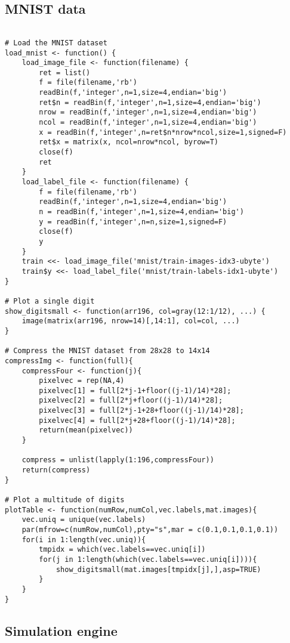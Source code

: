 \subsection{MNIST data}
\label{sec:appendicies:al:simulations:data}
{
\begin{lstlisting}

# Load the MNIST dataset
load_mnist <- function() {
	load_image_file <- function(filename) {
		ret = list()
		f = file(filename,'rb')
		readBin(f,'integer',n=1,size=4,endian='big')
		ret$n = readBin(f,'integer',n=1,size=4,endian='big')
		nrow = readBin(f,'integer',n=1,size=4,endian='big')
		ncol = readBin(f,'integer',n=1,size=4,endian='big')
		x = readBin(f,'integer',n=ret$n*nrow*ncol,size=1,signed=F)
		ret$x = matrix(x, ncol=nrow*ncol, byrow=T)
		close(f)
		ret
	}
	load_label_file <- function(filename) {
		f = file(filename,'rb')
		readBin(f,'integer',n=1,size=4,endian='big')
		n = readBin(f,'integer',n=1,size=4,endian='big')
		y = readBin(f,'integer',n=n,size=1,signed=F)
		close(f)
		y
	}
	train <<- load_image_file('mnist/train-images-idx3-ubyte')	
	train$y <<- load_label_file('mnist/train-labels-idx1-ubyte')
}

# Plot a single digit
show_digitsmall <- function(arr196, col=gray(12:1/12), ...) {
	image(matrix(arr196, nrow=14)[,14:1], col=col, ...)
}

# Compress the MNIST dataset from 28x28 to 14x14
compressImg <- function(full){
	compressFour <- function(j){
		pixelvec = rep(NA,4)
		pixelvec[1] = full[2*j-1+floor((j-1)/14)*28];
		pixelvec[2] = full[2*j+floor((j-1)/14)*28];
		pixelvec[3] = full[2*j-1+28+floor((j-1)/14)*28];
		pixelvec[4] = full[2*j+28+floor((j-1)/14)*28];
		return(mean(pixelvec))
	}
	
	compress = unlist(lapply(1:196,compressFour))
	return(compress)
}

# Plot a multitude of digits
plotTable <- function(numRow,numCol,vec.labels,mat.images){
	vec.uniq = unique(vec.labels)
	par(mfrow=c(numRow,numCol),pty="s",mar = c(0.1,0.1,0.1,0.1))
	for(i in 1:length(vec.uniq)){
		tmpidx = which(vec.labels==vec.uniq[i])
		for(j in 1:length(which(vec.labels==vec.uniq[i]))){
			show_digitsmall(mat.images[tmpidx[j],],asp=TRUE)
		}
	}
}
\end{lstlisting}
}

\subsection{Simulation engine}
\label{sec:appendicies:al:simulations:simengine}

